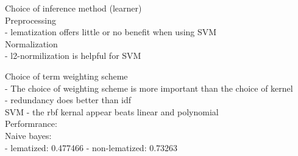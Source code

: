 \documentclass[letterpaper]{article}
\begin{document}
Choice of inference method (learner) \\

Preprocessing \\
- lematization offers little or no benefit when using SVM 
	\cite{leopold2002text}\\

Normalization \\
- l2-normilization is helpful for SVM \cite{leopold2002text}

Choice of term weighting scheme \\ 
- The choice of weighting scheme is more important than the choice
	of kernel \cite{leopold2002text}\\
- redundancy does better than idf\cite{leopold2002text} \\

SVM
- the rbf kernal appear beats linear and polynomial \cite{leopold2002text} \\

Performrance:\\
Naive bayes:\\
	- lematized: 0.477466
	- non-lematized: 0.73263



\end{document}
